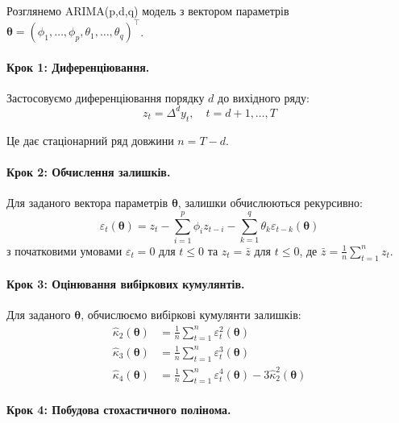 \documentclass[12pt,a4paper]{article}
\begin{document}
	Розглянемо ARIMA(p,d,q) модель з вектором параметрів $\boldsymbol{\theta} = (\phi_1, \ldots, \phi_p, \theta_1, \ldots, \theta_q)^\top$.
	
	\paragraph{Крок 1: Диференціювання.}
	
	Застосовуємо диференціювання порядку $d$ до вихідного ряду:
	\begin{equation}
		\label{eq:differenced_series}
		z_t = \Delta^d y_t, \quad t = d+1, \ldots, T
	\end{equation}
	
	Це дає стаціонарний ряд довжини $n = T - d$.
	
	\paragraph{Крок 2: Обчислення залишків.}
	
	Для заданого вектора параметрів $\boldsymbol{\theta}$, залишки обчислюються рекурсивно:
	\begin{equation}
		\label{eq:residuals}
		\varepsilon_t(\boldsymbol{\theta}) = z_t - \sum_{i=1}^{p} \phi_i z_{t-i} - \sum_{k=1}^{q} \theta_k \varepsilon_{t-k}(\boldsymbol{\theta})
	\end{equation}
	з початковими умовами $\varepsilon_t = 0$ для $t \leq 0$ та $z_t = \bar{z}$ для $t \leq 0$, де $\bar{z} = \frac{1}{n}\sum_{t=1}^{n} z_t$.
	
	\paragraph{Крок 3: Оцінювання вибіркових кумулянтів.}
	
	Для заданого $\boldsymbol{\theta}$, обчислюємо вибіркові кумулянти залишків:
	\begin{align}
		\hat{\kappa}_2(\boldsymbol{\theta}) &= \frac{1}{n} \sum_{t=1}^{n} \varepsilon_t^2(\boldsymbol{\theta}) \label{eq:sample_k2} \\
		\hat{\kappa}_3(\boldsymbol{\theta}) &= \frac{1}{n} \sum_{t=1}^{n} \varepsilon_t^3(\boldsymbol{\theta}) \label{eq:sample_k3} \\
		\hat{\kappa}_4(\boldsymbol{\theta}) &= \frac{1}{n} \sum_{t=1}^{n} \varepsilon_t^4(\boldsymbol{\theta}) - 3\hat{\kappa}_2^2(\boldsymbol{\theta}) \label{eq:sample_k4}
	\end{align}
	
	\paragraph{Крок 4: Побудова стохастичного полінома.}
	
\end{document}
